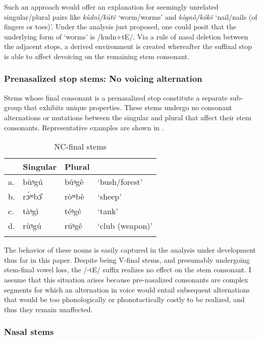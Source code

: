 \documentclass[output=paper,colorlinks,citecolor=brown]{langscibook}
\begin{document}
Such an approach would offer an explanation for seemingly unrelated singular/plural pairs like	\textit{kùdnì/kútê} `worm/worms' and \textit{kògnò/kókê} `nail/nails (of fingers or toes)'.  Under the analysis just proposed, one could posit that the underlying form of `worms' is /kudn+tE/. Via a rule of nasal deletion between the adjacent stops, a derived environment  is created whereafter the suffixal stop is able to affect devoicing on the remaining stem consonant.

\subsubsection{Prenasalized stop stems: No voicing alternation}

Stems whose final consonant is a prenasalized stop constitute a separate sub-group that exhibits unique properties. These stems undergo no consonant alternations or mutations between the singular and plural that affect their stem consonants. Representative examples are shown in .

\begin{table}
\caption{NC-final stems}
\label{tab:NCstems}
 \begin{tabular}{llll}
  \lsptoprule
& Singular & Plural &  \\
\midrule
a.&	bùᵑgú&	búᵑgê&	`bush/forest'\\			
b.&	rɔ́ᵐbɔ̂	&ròᵐbè&	`sheep'\\
c. & tàᵑgì & téᵑgê & `tank' \\
d. & rùᵑgú & rúᵑgê & `club (weapon)' \\
  \lspbottomrule
 \end{tabular}
\end{table}   

The behavior of these nouns is easily captured in the analysis under development thus far in this paper. Despite being V-final stems, and presumably undergoing stem-final vowel loss, the /-tE/ suffix realizes no effect on the stem consonant. I assume that this situation arises because  pre-nasalized consonants are complex segments for which an alternation in voice would entail subsequent alternations that would be too phonologically or  phonotactically costly to be realized, and thus they remain unaffected.


\subsubsection{Nasal stems}
\end{document}
